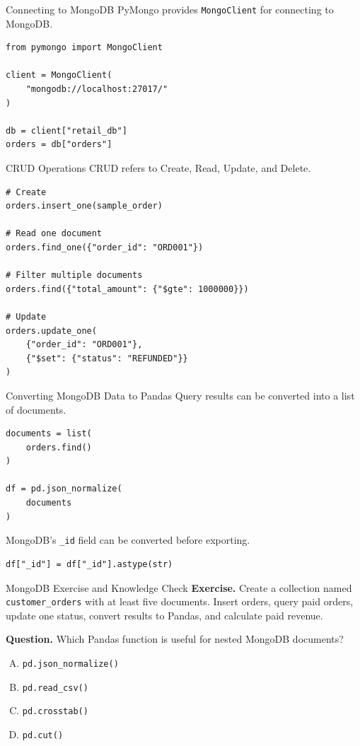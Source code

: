 \documentclass[aspectratio=169,11pt]{beamer}
\newcommand{\code}[1]{\texttt{#1}}
\newcommand{\smallgap}{\vspace{0.4em}}
\begin{document}
\begin{frame}[fragile]{Connecting to MongoDB}
PyMongo provides \code{MongoClient} for connecting to MongoDB.

\begin{lstlisting}[style=pythonstyle]
from pymongo import MongoClient

client = MongoClient(
    "mongodb://localhost:27017/"
)

db = client["retail_db"]
orders = db["orders"]
\end{lstlisting}
\end{frame}

\begin{frame}[fragile]{CRUD Operations}
CRUD refers to Create, Read, Update, and Delete.

\begin{lstlisting}[style=pythonstyle]
# Create
orders.insert_one(sample_order)

# Read one document
orders.find_one({"order_id": "ORD001"})

# Filter multiple documents
orders.find({"total_amount": {"$gte": 1000000}})

# Update
orders.update_one(
    {"order_id": "ORD001"},
    {"$set": {"status": "REFUNDED"}}
)
\end{lstlisting}
\end{frame}

\begin{frame}[fragile]{Converting MongoDB Data to Pandas}
Query results can be converted into a list of documents.

\begin{lstlisting}[style=pythonstyle]
documents = list(
    orders.find()
)

df = pd.json_normalize(
    documents
)
\end{lstlisting}

MongoDB's \code{\_id} field can be converted before exporting.
\begin{lstlisting}[style=pythonstyle]
df["_id"] = df["_id"].astype(str)
\end{lstlisting}
\end{frame}

\begin{frame}{MongoDB Exercise and Knowledge Check}
\textbf{Exercise.} Create a collection named \code{customer\_orders} with at least five documents. Insert orders, query paid orders, update one status, convert results to Pandas, and calculate paid revenue.

\smallgap
\textbf{Question.} Which Pandas function is useful for nested MongoDB documents?
\begin{enumerate}[A.]
  \item \code{pd.json\_normalize()}
  \item \code{pd.read\_csv()}
  \item \code{pd.crosstab()}
  \item \code{pd.cut()}
\end{enumerate}
\end{frame}
\end{document}
